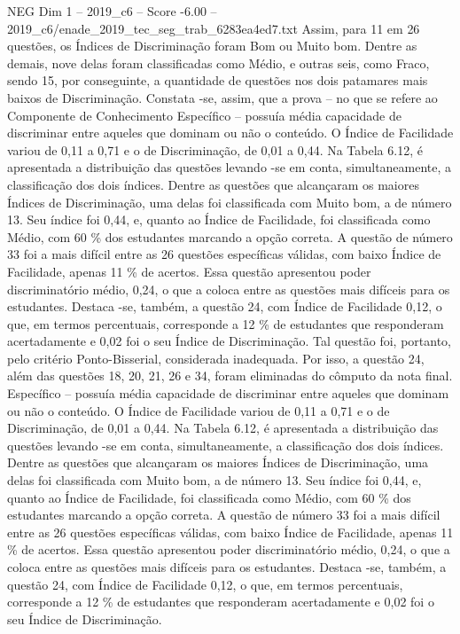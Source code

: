 \begin{textsample}{NEG Dim 1 – 2019\_c6 – Score -6.00 – 2019\_c6/enade\_2019\_tec\_seg\_trab\_6283ea4ed7.txt}
Assim, para 11 em 26 questões, os Índices de Discriminação foram Bom ou Muito bom.
Dentre as demais, nove delas foram classificadas como Médio, e outras seis, como Fraco, sendo 15, por conseguinte, a quantidade de questões nos dois patamares mais baixos de Discriminação.
Constata -se, assim, que a prova – no que se refere ao Componente de Conhecimento Específico – possuía média capacidade de discriminar entre aqueles que dominam ou não o conteúdo.
O Índice de Facilidade variou de 0,11 a 0,71 e o de Discriminação, de 0,01 a 0,44.
Na Tabela 6.12, é apresentada a distribuição das questões levando -se em conta, simultaneamente, a classificação dos dois índices.
Dentre as questões que alcançaram os maiores Índices de Discriminação, uma delas foi classificada com Muito bom, a de número 13.
Seu índice foi 0,44, e, quanto ao Índice de Facilidade, foi classificada como Médio, com 60 \% dos estudantes marcando a opção correta.
A questão de número 33 foi a mais difícil entre as 26 questões específicas válidas, com baixo Índice de Facilidade, apenas 11 \% de acertos.
Essa questão apresentou poder discriminatório médio, 0,24, o que a coloca entre as questões mais difíceis para os estudantes.
Destaca -se, também, a questão 24, com Índice de Facilidade 0,12, o que, em termos percentuais, corresponde a 12 \% de estudantes que responderam acertadamente e 0,02 foi o seu Índice de Discriminação.
Tal questão foi, portanto, pelo critério Ponto-Bisserial, considerada inadequada.
Por isso, a questão 24, além das questões 18, 20, 21, 26 e 34, foram eliminadas do cômputo da nota final.
Específico – possuía média capacidade de discriminar entre aqueles que dominam ou não o conteúdo.
O Índice de Facilidade variou de 0,11 a 0,71 e o de Discriminação, de 0,01 a 0,44.
Na Tabela 6.12, é apresentada a distribuição das questões levando -se em conta, simultaneamente, a classificação dos dois índices.
Dentre as questões que alcançaram os maiores Índices de Discriminação, uma delas foi classificada com Muito bom, a de número 13.
Seu índice foi 0,44, e, quanto ao Índice de Facilidade, foi classificada como Médio, com 60 \% dos estudantes marcando a opção correta.
A questão de número 33 foi a mais difícil entre as 26 questões específicas válidas, com baixo Índice de Facilidade, apenas 11 \% de acertos.
Essa questão apresentou poder discriminatório médio, 0,24, o que a coloca entre as questões mais difíceis para os estudantes.
Destaca -se, também, a questão 24, com Índice de Facilidade 0,12, o que, em termos percentuais, corresponde a 12 \% de estudantes que responderam acertadamente e 0,02 foi o seu Índice de Discriminação.

\end{textsample}
